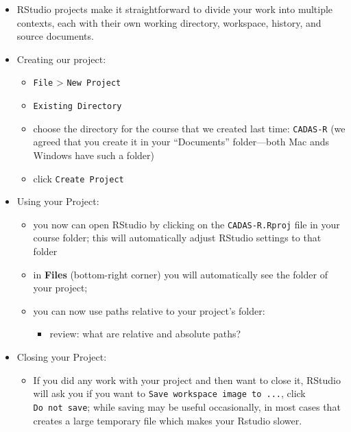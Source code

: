 \documentclass[
]{book}
\providecommand{\tightlist}{%
  \setlength{\itemsep}{0pt}\setlength{\parskip}{0pt}}
\begin{document}
\begin{itemize}
\tightlist
\item
  RStudio projects make it straightforward to divide your work into multiple contexts, each with their own working directory, workspace, history, and source documents.
\item
  Creating our project:

  \begin{itemize}
  \tightlist
  \item
    \texttt{File} \textgreater{} \texttt{New\ Project}
  \item
    \texttt{Existing\ Directory}
  \item
    choose the directory for the course that we created last time: \texttt{CADAS-R} (we agreed that you create it in your ``Documents'' folder---both Mac ands Windows have such a folder)
  \item
    click \texttt{Create\ Project}
  \end{itemize}
\item
  Using your Project:

  \begin{itemize}
  \tightlist
  \item
    you now can open RStudio by clicking on the \texttt{CADAS-R.Rproj} file in your course folder; this will automatically adjust RStudio settings to that folder
  \item
    in \textbf{Files} (bottom-right corner) you will automatically see the folder of your project;
  \item
    you can now use paths relative to your project's folder:

    \begin{itemize}
    \tightlist
    \item
      review: what are relative and absolute paths?
    \end{itemize}
  \end{itemize}
\item
  Closing your Project:

  \begin{itemize}
  \tightlist
  \item
    If you did any work with your project and then want to close it, RStudio will ask you if you want to \texttt{Save\ workspace\ image\ to\ ...}, click \texttt{Do\ not\ save}; while saving may be useful occasionally, in most cases that creates a large temporary file which makes your Rstudio slower.
  \end{itemize}
\end{itemize}
\end{document}
